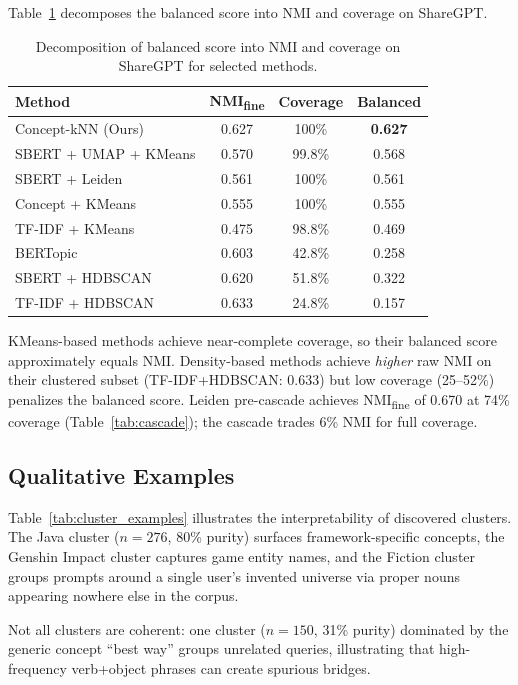 \documentclass[conference]{IEEEtran}
\begin{document}
Table~\ref{tab:component} decomposes the balanced score into NMI and coverage on ShareGPT.

\begin{table}[t]
\caption{Decomposition of balanced score into NMI and coverage on ShareGPT for selected methods.}
\label{tab:component}
\centering
\small
\begin{tabular}{@{}lccc@{}}
\toprule
\textbf{Method} & \textbf{NMI\textsubscript{fine}} & \textbf{Coverage} & \textbf{Balanced} \\
\midrule
Concept-kNN (Ours) & 0.627 & 100\% & \textbf{0.627} \\
SBERT + UMAP + KMeans & 0.570 & 99.8\% & 0.568 \\
SBERT + Leiden & 0.561 & 100\% & 0.561 \\
Concept + KMeans & 0.555 & 100\% & 0.555 \\
TF-IDF + KMeans & 0.475 & 98.8\% & 0.469 \\
BERTopic & 0.603 & 42.8\% & 0.258 \\
SBERT + HDBSCAN & 0.620 & 51.8\% & 0.322 \\
TF-IDF + HDBSCAN & 0.633 & 24.8\% & 0.157 \\
\bottomrule
\end{tabular}
\end{table}

KMeans-based methods achieve near-complete coverage, so their balanced score approximately equals NMI. Density-based methods achieve \textit{higher} raw NMI on their clustered subset (TF-IDF+HDBSCAN: 0.633) but low coverage (25--52\%) penalizes the balanced score. Leiden pre-cascade achieves NMI\textsubscript{fine} of 0.670 at 74\% coverage (Table~\ref{tab:cascade}); the cascade trades 6\% NMI for full coverage.

\subsection{Qualitative Examples}

Table~\ref{tab:cluster_examples} illustrates the interpretability of discovered clusters. The Java cluster ($n\!=\!276$, 80\% purity) surfaces framework-specific concepts, the Genshin Impact cluster captures game entity names, and the Fiction cluster groups prompts around a single user's invented universe via proper nouns appearing nowhere else in the corpus.

Not all clusters are coherent: one cluster ($n\!=\!150$, 31\% purity) dominated by the generic concept ``best way'' groups unrelated queries, illustrating that high-frequency verb+object phrases can create spurious bridges.
\end{document}
